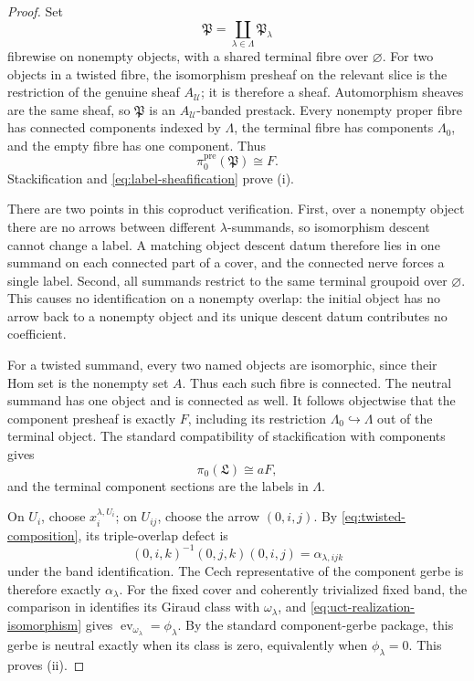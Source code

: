 \begin{proof}
Set
\[
 \mathfrak P=\coprod_{\lambda\in\Lambda}\mathfrak P_\lambda
\]
fibrewise on nonempty objects, with a shared terminal fibre over
\(\varnothing\).  For two objects in a twisted fibre, the isomorphism
presheaf on the relevant slice is the restriction of the genuine sheaf
\(A_{\mathcal U}\); it is therefore a sheaf.  Automorphism sheaves are the
same sheaf, so \(\mathfrak P\) is an \(A_{\mathcal U}\)-banded prestack.
Every nonempty proper fibre has connected components indexed by \(\Lambda\),
the terminal fibre has components \(\Lambda_0\), and the empty fibre has one
component.  Thus
\[
 \pi_0^{\mathrm{pre}}(\mathfrak P)\cong F.
\]
Stackification and \eqref{eq:label-sheafification} prove (i).

There are two points in this coproduct verification.  First, over a nonempty
object there are no arrows between different \(\lambda\)-summands, so
isomorphism descent cannot change a label.  A matching object descent datum
therefore lies in one summand on each connected part of a cover, and the
connected nerve forces a single label.  Second, all summands restrict to the
same terminal groupoid over \(\varnothing\).  This causes no identification
on a nonempty overlap: the initial object has no arrow back to a nonempty
object and its unique descent datum contributes no coefficient.

For a twisted summand, every two named objects are isomorphic, since their
Hom set is the nonempty set \(A\).  Thus each such fibre is connected.
The neutral summand has one object and is connected as well.  It follows
objectwise that the component presheaf is exactly \(F\), including its
restriction \(\Lambda_0\hookrightarrow\Lambda\) out of the terminal object.
The standard compatibility of stackification with components gives
\[
 \pi_0(\mathfrak L)\cong aF,
\]
and the terminal component sections are the labels in \(\Lambda\).

On \(U_i\), choose \(x_i^{\lambda,U_i}\); on \(U_{ij}\), choose the arrow
\((0,i,j)\).  By \eqref{eq:twisted-composition}, its triple-overlap defect is
\[
 (0,i,k)^{-1}(0,j,k)(0,i,j)
 =\alpha_{\lambda,ijk}
\]
under the band identification.  The Cech representative of the component
gerbe is therefore exactly \(\alpha_\lambda\).  For the fixed cover and
coherently trivialized fixed band, the comparison in
 identifies its Giraud class with
\(\omega_\lambda\), and
\eqref{eq:uct-realization-isomorphism} gives
\(\operatorname{ev}_{\omega_\lambda}=\phi_\lambda\).  By the standard
component-gerbe package, this gerbe is neutral exactly when its class is zero,
equivalently when \(\phi_\lambda=0\).  This proves (ii).


\end{proof}
